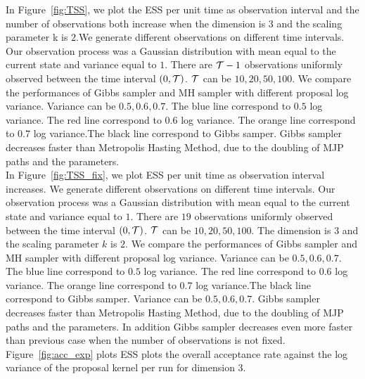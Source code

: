 In Figure~\ref{fig:TSS}, we plot the ESS per unit time as observation interval and the number of observations both increase when the dimension is $3$ and the scaling parameter k is $2$.We generate different observations on different time intervals. Our observation process was a Gaussian distribution with mean equal to the current state and variance equal to $1$. There are ${\mathcal T} - 1$ observations uniformly observed between the time interval $(0, {\mathcal T})$. ${\mathcal T}$ can be $10, 20, 50, 100$. We compare the performances of Gibbs sampler and MH sampler with different proposal log variance. Variance can be $0.5, 0.6, 0.7$. The blue line correspond to $0.5$ log variance. The red line correspond to $0.6$ log variance. The orange line correspond to $0.7$ log variance.The black line correspond to Gibbs samper. Gibbs sampler decreases faster than Metropolis Hasting Method, due to the doubling of MJP paths and the parameters. \\

In Figure~\ref{fig:TSS_fix}, we plot ESS per unit time as observation interval increases. We generate different observations on different time intervals. Our observation process was a Gaussian distribution with mean equal to the current state and variance equal to $1$. There are $19$ observations uniformly observed between the time interval $(0, {\mathcal T})$. ${\mathcal T}$ can be $10, 20, 50, 100$. The dimension is $3$ and the scaling parameter $k$ is $2$. We compare the performances of Gibbs sampler and MH sampler with different proposal log variance. Variance can be $0.5, 0.6, 0.7$. The blue line correspond to $0.5$ log variance. The red line correspond to $0.6$ log variance. The orange line correspond to $0.7$ log variance.The black line correspond to Gibbs samper.  Variance can be $0.5, 0.6, 0.7$. Gibbs sampler decreases faster than Metropolis Hasting Method, due to the doubling of MJP paths and the parameters. In addition Gibbs sampler decreases even more faster than previous case when the number of observations is not fixed. \\




Figure~\ref{fig:acc_exp} plots ESS plots the overall  acceptance rate against the log variance of the proposal kernel per run for dimension $3$. 

